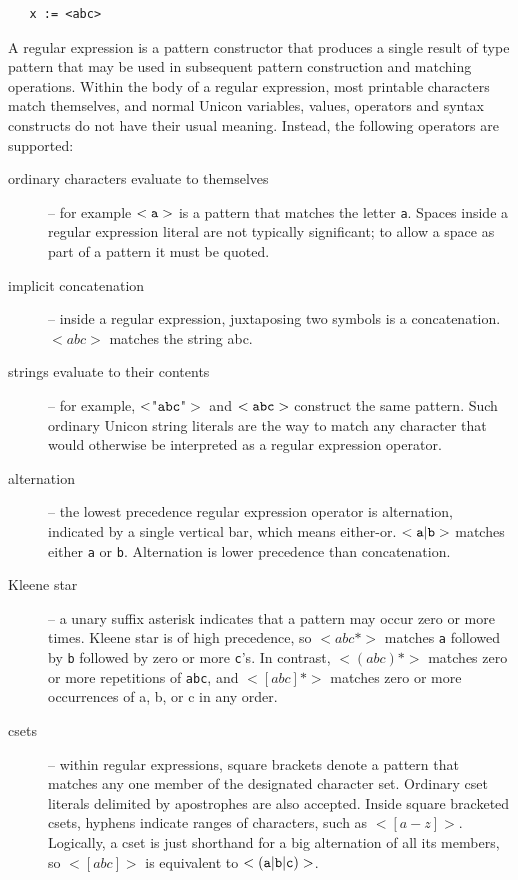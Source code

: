 \documentclass[letterpaper,12pt]{article}
\begin{document}
\begin{verbatim}
   x := <abc>
\end{verbatim}

A regular expression is a pattern constructor that produces a single
result of type pattern that may be used in subsequent pattern
construction and matching operations.  Within the body of a regular
expression, most printable characters match themselves, and normal
Unicon variables, values, operators and syntax constructs do not have
their usual meaning. Instead, the following operators are supported:

\begin{description}
\item [ordinary characters evaluate to themselves] -- for example
${\tt <a>}$ is a pattern that matches the letter {\tt a}.  Spaces
inside a regular expression literal are not typically significant;
to allow a space as part of a pattern it must be quoted.
\item [implicit concatenation] -- inside a regular expression,
juxtaposing two symbols is a concatenation. $<abc>$ matches the
string abc.
\item [strings evaluate to their contents] -- for example,
${\tt <}${\ttfamily"}${\tt abc}${\ttfamily"}$>$ and ${\tt <abc>}$
construct the same
pattern. Such ordinary Unicon string literals are the way to match any
character that would otherwise be interpreted as a regular
expression operator.
\item [alternation] -- the lowest precedence regular expression
operator is alternation, indicated by a single vertical bar, which
means either-or. ${\tt <a\vert b>}$ matches either {\tt a} or {\tt b}.
Alternation is lower precedence than concatenation.
\item [Kleene star] -- a unary suffix asterisk indicates that a
pattern may occur zero or more times. Kleene star is of high
precedence, so {\tt $<abc*>$} matches {\tt a} followed by {\tt b}
followed by zero or more {\tt c}'s. In contrast, {\tt $<(abc)*>$}
matches zero or more repetitions of {\tt abc}, and {\tt $<[abc]*>$}
matches zero or more occurrences of a, b, or c in any order.
\item [csets] -- within regular expressions, square brackets denote
a pattern that matches any one member of the designated character
set. Ordinary cset literals delimited by apostrophes are also accepted.
Inside square bracketed csets,
hyphens indicate ranges of characters, such as {\tt $<[a-z]>$}.  Logically,
a cset is just shorthand for a big alternation of all its members, so
{\tt $<[abc]>$} is equivalent to ${\tt <(a\vert b\vert c)>}$.

\end{description}
\end{document}
